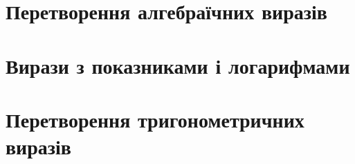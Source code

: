 \documentclass{book}
\begin{document}
\chapter{Перетворення алгебраїчних виразів}

\chapter{Вирази з показниками і логарифмами}

\chapter{Перетворення тригонометричних виразів}

\end{document}
